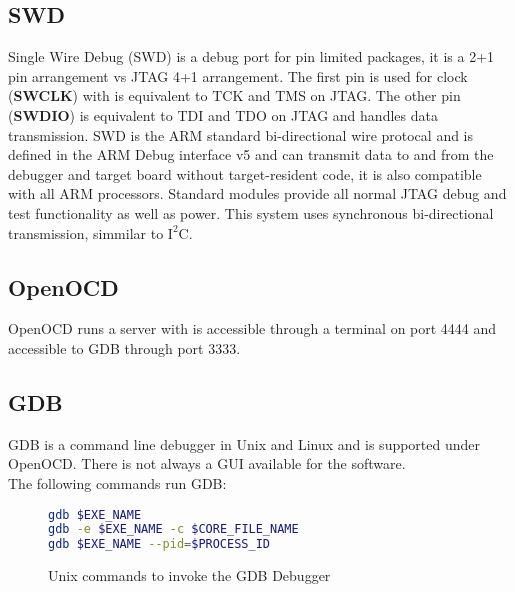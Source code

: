 \subsection{SWD}
\label{section:SWD}
Single Wire Debug (SWD) is a debug port for pin limited packages, it is a 2+1 pin arrangement vs JTAG 4+1 arrangement. The first pin is used for
clock (\textbf{SWCLK}) with is equivalent to TCK and TMS on JTAG. The other pin (\textbf{SWDIO}) is equivalent to TDI and TDO on JTAG and handles
data transmission. SWD is the ARM standard bi-directional wire protocal and is defined in the ARM Debug interface v5 and can transmit data to and from the
debugger and target board without target-resident code, it is also compatible with all ARM processors. Standard modules provide all normal JTAG debug and test 
functionality as well as power. This system uses synchronous bi-directional transmission, simmilar to $\textrm{I}^2\textrm{C}$.

\subsection{OpenOCD}
\label{section:OpenOCD}
OpenOCD runs a server with is accessible through a terminal on port 4444 and accessible to GDB through port 3333.



\subsection{GDB}
\label{section:GDB}
GDB is a command line debugger in Unix and Linux and is supported under OpenOCD. There is not always a GUI available for the software.\\

The following commands run GDB:
\vspace{0.5cm}

\begin{figure}[H]
\begin{center}
\begin{lstlisting}[language=bash]
gdb $EXE_NAME
gdb -e $EXE_NAME -c $CORE_FILE_NAME
gdb $EXE_NAME --pid=$PROCESS_ID
\end{lstlisting}
\end{center}
\caption{Unix commands to invoke the GDB Debugger}
\label{fig:unix-commands}
\end{figure}
